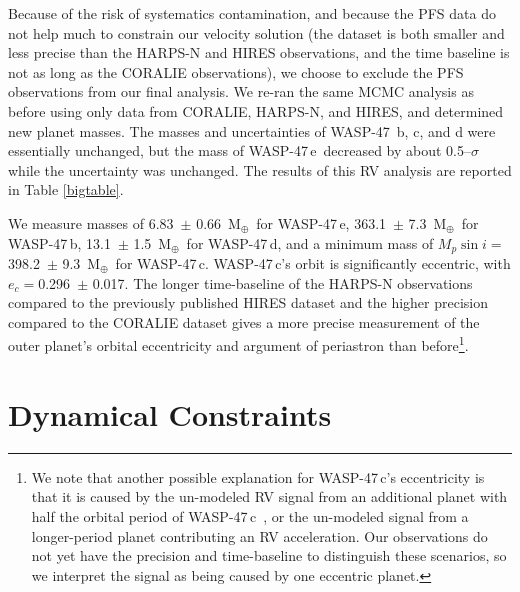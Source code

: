\documentclass{emulateapj}
\newcommand{\thisstar}{WASP-47}
\newcommand{\thisfirstplanet}{WASP-47\,b}
\newcommand{\thissecondplanet}{WASP-47\,e}
\newcommand{\thisthirdplanet}{WASP-47\,d}
\newcommand{\thisfourthplanet}{WASP-47\,c}
\newcommand{\mearth}{M$_\oplus$}
\newcommand{\mplb}{363.1}
\newcommand{\umplb}{7.3}
\newcommand{\mple}{6.83}
\newcommand{\umple}{0.66}
\newcommand{\mpld}{13.1}
\newcommand{\umpld}{1.5}
\newcommand{\mplc}{398.2}
\newcommand{\umplc}{9.3}
\newcommand{\eccc}{0.296}
\newcommand{\ueccc}{0.017}
\begin{document}
Because of the risk of systematics contamination, and because the PFS data do not help much to constrain our velocity solution (the dataset is both smaller and less precise than the HARPS-N and HIRES observations, and the time baseline is not as long as the CORALIE observations), we choose to exclude the PFS observations from our final analysis. We re-ran the same MCMC analysis as before using only data from CORALIE, HARPS-N, and HIRES, and determined new planet masses. The masses and uncertainties of \thisstar\ b, c, and d were essentially unchanged, but the mass of \thissecondplanet\ decreased by about 0.5--$\sigma$ while the uncertainty was unchanged. The results of this RV analysis are reported in Table \ref{bigtable}. 

We measure masses of \mple\ $\pm$ \umple\ \mearth\ for \thissecondplanet, \mplb\ $\pm$ \umplb\ \mearth\ for \thisfirstplanet, \mpld\ $\pm$ \umpld\ \mearth\ for \thisthirdplanet, and a minimum mass of $M_p\sin{i} =$ \mplc\ $\pm$ \umplc\ \mearth\ for \thisfourthplanet. \thisfourthplanet's orbit is significantly eccentric, with $e_{c} =$\eccc\ $\pm$ \ueccc. The longer time-baseline of the HARPS-N observations compared to the previously published HIRES dataset and the higher precision compared to the CORALIE dataset gives a more precise measurement of the outer planet's orbital eccentricity and argument of periastron than before\footnote{We note that another possible explanation for \thisfourthplanet's eccentricity is that it is caused by the un-modeled RV signal from an additional planet with half the orbital period of \thisfourthplanet\ \citep{angladaescude}, or the un-modeled signal from a longer-period planet \citep[as postulated by][]{weissw47} contributing an RV acceleration. Our observations do not yet have the precision and time-baseline to distinguish these scenarios, so we interpret the signal as being caused by one eccentric planet. }. 


\section{Dynamical Constraints}
\label{dynamics}
\end{document}

